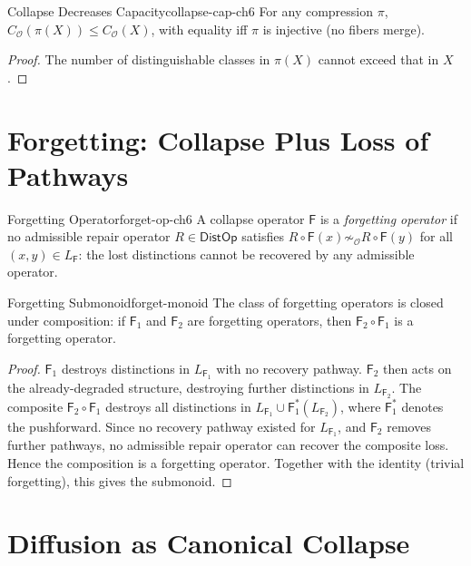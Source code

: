 \documentclass[12pt,twoside,openright]{book}
\newcommand{\obs}{\mathcal{O}}
\newcommand{\distOp}{\mathsf{DistOp}}
\providecommand{\capObs}[1]{C_{\obs}(#1)}
\providecommand{\forgetOp}{\mathsf{F}}
\begin{document}
\begin{corollary}{Collapse Decreases Capacity}{collapse-cap-ch6}
For any compression $\pi$, $\capObs{\pi(X)}\le\capObs{X}$,
with equality iff $\pi$ is injective (no fibers merge).
\begin{proof}
The number of distinguishable classes in $\pi(X)$ cannot
exceed that in $X$.
\end{proof}
\end{corollary}

\section{Forgetting: Collapse Plus Loss of Pathways}

\begin{definition}{Forgetting Operator}{forget-op-ch6}
A collapse operator $\forgetOp$ is a \emph{forgetting
operator} if no admissible repair operator $R\in\distOp$
satisfies $R\circ\forgetOp(x)\not\sim_\obs R\circ\forgetOp(y)$
for all $(x,y)\in L_{\forgetOp}$: the lost distinctions cannot
be recovered by any admissible operator.
\end{definition}

\begin{theorem}{Forgetting Submonoid}{forget-monoid}
The class of forgetting operators is closed under composition:
if $\forgetOp_1$ and $\forgetOp_2$ are forgetting operators,
then $\forgetOp_2\circ\forgetOp_1$ is a forgetting operator.
\begin{proof}
$\forgetOp_1$ destroys distinctions in $L_{\forgetOp_1}$
with no recovery pathway. $\forgetOp_2$ then acts on the
already-degraded structure, destroying further distinctions
in $L_{\forgetOp_2}$. The composite $\forgetOp_2\circ
\forgetOp_1$ destroys all distinctions in
$L_{\forgetOp_1}\cup\forgetOp_1^*(L_{\forgetOp_2})$, where
$\forgetOp_1^*$ denotes the pushforward. Since no recovery
pathway existed for $L_{\forgetOp_1}$, and $\forgetOp_2$
removes further pathways, no admissible repair operator
can recover the composite loss. Hence the composition
is a forgetting operator. Together with the identity
(trivial forgetting), this gives the submonoid.
\end{proof}
\end{theorem}

\section{Diffusion as Canonical Collapse}
\end{document}
